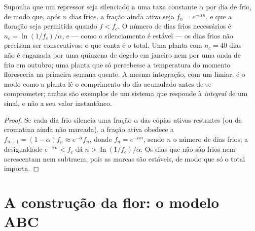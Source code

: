 \begin{theorem}\label{thm:b2:plant-flowering:integration}
Suponha que um repressor seja silenciado a uma taxa constante $\alpha$
por dia de frio, de modo que, após $n$ dias frios, a fração ainda ativa
seja $f_n = e^{-\alpha n}$, e que a floração seja permitida quando
$f < f_c$. O número de dias frios necessários é
$n_c = \ln(1/f_c)/\alpha$, e --- como o silenciamento é estável --- os
dias frios não precisam ser consecutivos: o que conta é o total. Uma
planta com $n_c = 40$ dias não é enganada por uma quinzena de degelo em
janeiro nem por uma onda de frio em outubro; uma planta que só
percebesse a temperatura do momento floresceria na primeira semana
quente. A mesma integração, com um limiar, é o modo como a planta lê o
comprimento do dia acumulado antes de se comprometer; ambas são
exemplos de um sistema que responde à \emph{integral} de um sinal, e
não a seu valor instantâneo.
\end{theorem}
\begin{proof}
Se cada dia frio silencia uma fração $\alpha$ das cópias ativas
restantes (ou da cromatina ainda não marcada), a fração ativa obedece a
$f_{n+1} = (1 - \alpha)f_n \approx e^{-\alpha}f_n$, donde
$f_n = e^{-\alpha n}$, sendo $n$ o número de dias frios; a desigualdade
$e^{-\alpha n} < f_c$ dá $n > \ln(1/f_c)/\alpha$. Os dias que não são
frios nem acrescentam nem subtraem, pois as marcas são estáveis, de
modo que só o total importa.
\end{proof}

\section{A construção da flor: o modelo ABC}


